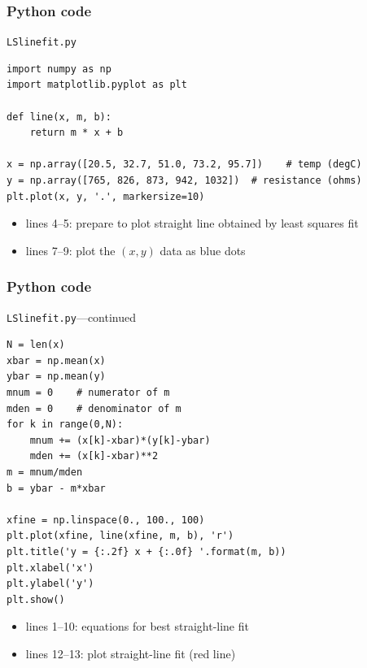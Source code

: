\documentclass[english,14pt]{beamer}
\begin{document}

\begin{frame}[fragile]

\frametitle{Python code}

\vspace*{-3mm}

\texttt{LSlinefit.py}
\vspace*{-2mm}

\begin{lstlisting}[style=CStyle,basicstyle=\scriptsize]
import numpy as np
import matplotlib.pyplot as plt

def line(x, m, b):
    return m * x + b

x = np.array([20.5, 32.7, 51.0, 73.2, 95.7])    # temp (degC)
y = np.array([765, 826, 873, 942, 1032])  # resistance (ohms)
plt.plot(x, y, '.', markersize=10)
\end{lstlisting}

\begin{itemize}
	\item lines 4--5: prepare to plot straight line obtained by least squares fit
	\item lines 7--9: plot the $(x,y)$ data as blue dots
\end{itemize}

\end{frame}


\begin{frame}[fragile]

\frametitle{Python code}

\vspace*{-3mm}

\texttt{LSlinefit.py}---continued
\vspace*{-1mm}

\begin{lstlisting}[style=CStyle,basicstyle=\scriptsize]
N = len(x)
xbar = np.mean(x)
ybar = np.mean(y)
mnum = 0    # numerator of m
mden = 0    # denominator of m
for k in range(0,N):
    mnum += (x[k]-xbar)*(y[k]-ybar)
    mden += (x[k]-xbar)**2
m = mnum/mden
b = ybar - m*xbar

xfine = np.linspace(0., 100., 100)
plt.plot(xfine, line(xfine, m, b), 'r')
plt.title('y = {:.2f} x + {:.0f} '.format(m, b))
plt.xlabel('x')
plt.ylabel('y')
plt.show()
\end{lstlisting}

\begin{itemize}
	\item lines 1--10: equations for best straight-line fit
	\item lines 12--13: plot straight-line fit (red line)
\end{itemize}

\end{frame}
\end{document}
